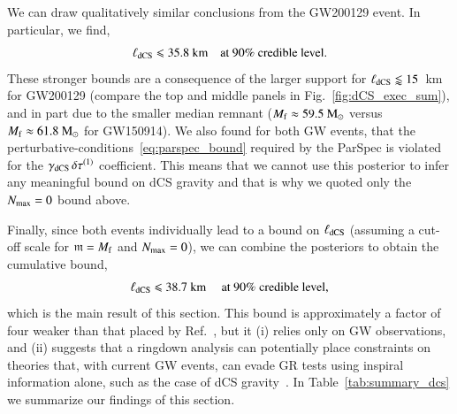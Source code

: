 \documentclass[twocolumn,
               prd,
               aps,
               superscriptaddress,
               tightenlines,
               nofootinbib,
               eqsecnum,
               amsfonts,
               amsmath,
               longbibliography]{revtex4-1}
\newcommand{\gm}{\mathfrak{m}}
\newcommand{\msun}{~{\rm M}_{\odot}}
\begin{document}
We can draw qualitatively similar conclusions from the GW200129 event.
In particular, we find,
%
\begin{equation}
\ell_{\rm dCS} \leqslant 35.8~\textrm{km}
\quad \textrm{at 90\% credible level}.
\end{equation}
These stronger bounds are a consequence of the larger support for $\ell_{\rm dCS} \lessapprox 15$~km
for GW200129 (compare the top and middle panels in Fig.~\ref{fig:dCS_exec_sum}), and in part due to
the smaller median remnant ($M_{\rm f} \approx 59.5\msun$ versus $M_{\rm f} \approx 61.8\msun$ for GW150914).
%
We also found for both GW events, that the perturbative-conditions~\eqref{eq:parspec_bound} required by the ParSpec
is violated for the $\gamma_{\rm dCS} \, \delta \tau^{(1)}$ coefficient.
%
This means that we cannot use this posterior to infer any meaningful bound on dCS gravity
and that is why we quoted only the $N_{\rm max}=0$ bound above.

Finally, since both events individually lead to a bound on $\ell_{\rm dCS}$
(assuming a cut-off scale for $\gm = M_{\rm f}$ and $N_{\rm max}=0$), we can combine the
posteriors to obtain the cumulative bound,
%
\begin{equation}
\ell_{\rm dCS} \leqslant 38.7~\textrm{km}
\quad \textrm{ at 90\% credible level},
\end{equation}
%
which is the main result of this section.
%
This bound is approximately a factor of four weaker than that placed by
Ref.~\cite{Silva:2020acr}, but it
%
(i) relies only on GW observations, and
%
(ii) suggests that a ringdown analysis can potentially place constraints on
theories that, with current GW events, can evade GR tests using inspiral information
alone, such as the case of dCS gravity~\cite{Nair:2019iur,Perkins:2021mhb,Lyu:2022gdr}.
%
In Table~\ref{tab:summary_dcs} we summarize our findings of this section.
\end{document}
